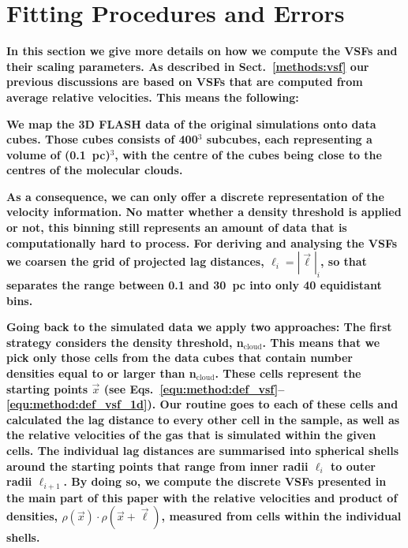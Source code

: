 \section{Fitting Procedures and Errors}\label{appFitting}

\textbf{
    In this section we give more details on how we compute the VSFs and their scaling parameters.
    As described in Sect.~\ref{methods:vsf} our previous discussions are based on VSFs that are computed from average relative velocities. 
    This means the following:
}

\textbf{ 
    We map the 3D FLASH data of the original simulations  onto data cubes. 
    Those cubes consists of 400$^3$ subcubes, each representing a volume of (0.1~pc)$^3$, with the centre of the cubes being close to the centres of the molecular clouds. 
}

\textbf{
    As a consequence, we can only offer a discrete representation of the velocity information. 
    No matter whether a density threshold is applied or not, this binning still represents an amount of data that is computationally hard to process.
    For deriving and analysing the VSFs we coarsen the grid of projected lag distances, $\ell_i = |\vec{\ell}|_i$, so that separates the range between 0.1 and 30~pc into only 40 equidistant bins.
}

\textbf{
    Going back to the simulated data we apply two approaches: 
    The first strategy considers the density threshold, n$_\mathrm{cloud}$.
    This means that we pick only those cells from the data cubes that contain number densities equal to or larger than n$_\mathrm{cloud}$.
    These cells represent the starting points $\vec{x}$ (see Eqs.~\ref{equ:method:def_vsf}--\ref{equ:method:def_vsf_1d}).
    Our routine goes to each of these cells and calculated the lag distance to every other cell in the sample, as well as the relative velocities of the gas that is simulated within the given cells. 
    The individual lag distances are summarised into spherical shells around the starting points that range from inner radii $\ell_{i}$ to outer radii $\ell_{i+1}$. 
    By doing so, we compute the discrete VSFs presented in the main part of this paper with the relative velocities and product of densities, $\rho(\vec{x}) \cdot \rho(\vec{x}+\vec{\ell})$, measured from cells within the individual shells.
}

